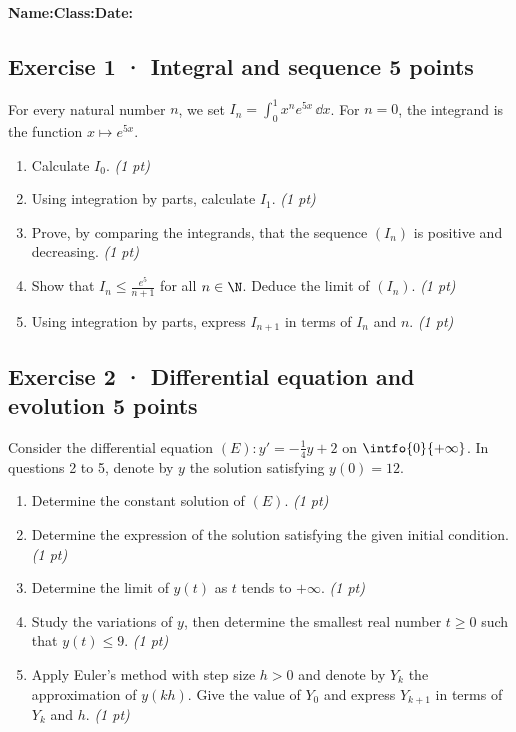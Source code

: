 \smallskip\textbf{Name:}\enspace\dotfill\quad\textbf{Class:}\enspace\dotfill\quad\textbf{Date:}\enspace\dotfill

\subsection*{Exercise 1 · Integral and sequence \hfill 5 points}For every natural number $n$, we set $I_n=\displaystyle\int_0^1x^ne^{5x}\,\dd x$. For $n=0$, the integrand is the function $x\mapsto e^{5x}$.

\begin{enumerate}

\item Calculate $I_0$. \hfill\textit{(1 pt)}

\item Using integration by parts, calculate $I_1$. \hfill\textit{(1 pt)}

\item Prove, by comparing the integrands, that the sequence $(I_n)$ is positive and decreasing. \hfill\textit{(1 pt)}

\item Show that $I_n\le\frac{e^{5}}{n+1}$ for all $n\in\N$. Deduce the limit of $(I_n)$. \hfill\textit{(1 pt)}

\item Using integration by parts, express $I_{n+1}$ in terms of $I_n$ and $n$. \hfill\textit{(1 pt)}

\end{enumerate}

\subsection*{Exercise 2 · Differential equation and evolution \hfill 5 points}Consider the differential equation $(E):y'=-\frac1{4}y+2$ on $\intfo{0}{+\infty}$. In questions 2 to 5, denote by $y$ the solution satisfying $y(0)=12$.

\begin{enumerate}

\item Determine the constant solution of $(E)$. \hfill\textit{(1 pt)}

\item Determine the expression of the solution satisfying the given initial condition. \hfill\textit{(1 pt)}

\item Determine the limit of $y(t)$ as $t$ tends to $+\infty$. \hfill\textit{(1 pt)}

\item Study the variations of $y$, then determine the smallest real number $t\ge0$ such that $y(t)\le9$. \hfill\textit{(1 pt)}

\item Apply Euler's method with step size $h>0$ and denote by $Y_k$ the approximation of $y(kh)$. Give the value of $Y_0$ and express $Y_{k+1}$ in terms of $Y_k$ and $h$. \hfill\textit{(1 pt)}

\end{enumerate}

